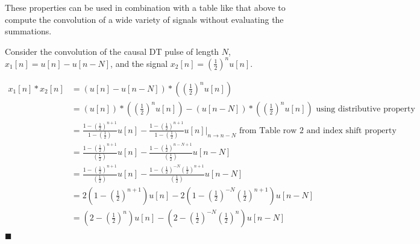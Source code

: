 These properties can be used in combination with a table like that above to compute the convolution of a wide variety of signals without evaluating the summations.

\begin{example} Consider the convolution of the causal DT pulse of length $N$, $x_1[n] = u[n] - u[n-N]$, and the signal $x_2[n] = \left( \frac{1}{2}\right)^nu[n]$.

  \begin{align*}
    x_1[n] * x_2[n] &= \left( u[n] - u[n-N]\right) * \left( \left( \frac{1}{2}\right)^nu[n] \right)\\
    &= \left( u[n] \right) * \left( \left( \frac{1}{2}\right)^nu[n] \right) - \left( u[n-N]\right) * \left( \left( \frac{1}{2}\right)^nu[n] \right) \mbox{ using distributive property}\\
    &= \frac{1-\left(\frac{1}{2}\right)^{n+1}}{1-\left(\frac{1}{2}\right)}u[n] - \frac{1-\left(\frac{1}{2}\right)^{n+1}}{1-\left(\frac{1}{2}\right)}u[n] \Big|_{n\rightarrow n-N} \mbox{ from Table row 2 and index shift property}\\
    &= \frac{1-\left(\frac{1}{2}\right)^{n+1}}{\left(\frac{1}{2}\right)}u[n] - \frac{1-\left(\frac{1}{2}\right)^{n-N+1}}{\left(\frac{1}{2}\right)}u[n-N]\\
    &= \frac{1-\left(\frac{1}{2}\right)^{n+1}}{\left(\frac{1}{2}\right)}u[n] - \frac{1-\left(\frac{1}{2}\right)^{-N}\left(\frac{1}{2}\right)^{n+1}}{\left(\frac{1}{2}\right)}u[n-N]\\
    &= 2\left(1-\left(\frac{1}{2}\right)^{n+1}\right)u[n] - 2\left(1-\left(\frac{1}{2}\right)^{-N}\left(\frac{1}{2}\right)^{n+1} \right)u[n-N]\\
    &= \left(2-\left(\frac{1}{2}\right)^{n}\right)u[n] - \left(2-\left(\frac{1}{2}\right)^{-N}\left(\frac{1}{2}\right)^{n} \right)u[n-N]
  \end{align*}
$\blacksquare$
\end{example}

